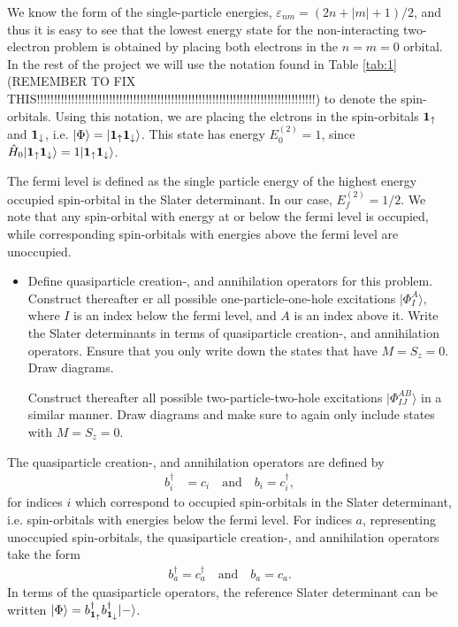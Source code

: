 \documentclass[a4paper]{article}
\newcommand{\tab}[1]{Table \ref{tab:#1}}
\renewcommand{\u}[1]{{\bf #1}_\uparrow}
\renewcommand{\d}[1]{{\bf #1}_\downarrow}
\newcommand{\boud}{b_{\u{1}}^\dagger}
\newcommand{\bodd}{b_{\d{1}}^\dagger}
\begin{document}
We know the form of the single-particle energies, $\varepsilon_{n m}=(2n+|m|+1)/2$, and thus it is easy to see that the lowest energy state for the non-interacting two-electron problem is obtained by placing both electrons in the $n=m=0$ orbital. In the rest of the project we will use the notation found in \tab{1} (REMEMBER TO FIX THIS!!!!!!!!!!!!!!!!!!!!!!!!!!!!!!!!!!!!!!!!!!!!!!!!!!!!!!!!!!!!!!!!!!!!!!!!!!!!!!!!!) to denote the spin-orbitals. Using this notation, we are placing the elctrons in the spin-orbitals $\u{1}$ and $\d{1}$, i.e. $|\Phi\rangle = |\u{1}\d{1}\rangle$. This state has energy $E_0^{(2)}=1$, since $\hat{H}_0|\u{1}\d{1}\rangle=1|\u{1}\d{1}\rangle$. 

The fermi level is defined as the single particle energy of the highest energy occupied spin-orbital in the Slater determinant. In our case, $E^{(2)}_f=1/2$. We note that any spin-orbital with energy at or below the fermi level is occupied, while corresponding spin-orbitals with energies above the fermi level are unoccupied.

\begin{exframe}
\begin{itemize}
  \item[\phantom{2a)}] Define quasiparticle creation-, and annihilation operators for this problem. Construct thereafter er all possible one-particle-one-hole excitations $|\Phi^A_I\rangle$, where $I$ is an index below the fermi level, and $A$ is an index above it. Write the Slater determinants in terms of quasiparticle creation-, and annihilation operators. Ensure that you only write down the states that have $M=S_z=0$. Draw diagrams.

  Construct thereafter all possible two-particle-two-hole excitations $|\Phi_{IJ}^{AB}\rangle$ in a similar manner. Draw diagrams and make sure to again only include states with $M=S_z=0$. 
\end{itemize}
\end{exframe}
The quasiparticle creation-, and annihilation operators are defined by
\begin{align}
b^\dagger_i &= c_i \ \ \ \text{ and } \ \ \ b_i = c_i^\dagger,
\end{align}
for indices $i$ which correspond to occupied spin-orbitals in the Slater determinant, i.e. spin-orbitals with energies below the fermi level. For indices $a$, representing unoccupied spin-orbitals, the quasiparticle creation-, and annihilation operators take the form
\begin{align}
b^\dagger_a = c^\dagger_a \ \ \ \text{ and } \ \ \ b_a = c_a.
\end{align}
In terms of the quasiparticle operators, the reference Slater determinant can be written $|\Phi\rangle = \boud\bodd|-\rangle$.
\end{document}
